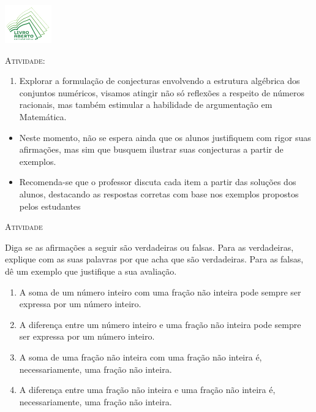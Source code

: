 \documentclass[10 pt,usenames,dvipsnames, oneside]{article}
\begin{document}
\begin{center}
  \begin{minipage}[l]{3cm}
\includegraphics[width=2cm]{../../../Figuras/logo}       
\end{minipage}\hfill
\begin{minipage}[r]{.8\textwidth}
 {\Large \scshape Atividade: }  
\end{minipage}
\end{center}
\vspace{.2cm}

\ifdefined\prof
\begin{goals}
\begin{enumerate}
    \item       Explorar a formulação de conjecturas envolvendo a estrutura algébrica dos conjuntos numéricos, visamos atingir não só reflexões a respeito de números racionais, mas também estimular a habilidade de argumentação em Matemática.
\end{enumerate}

\tcblower

\begin{itemize}
    \item       Neste momento, não se espera ainda que os alunos justifiquem com rigor suas afirmações, mas sim que busquem ilustrar suas conjecturas a partir de exemplos.
    \item       Recomenda-se que o professor discuta cada item a partir das soluções dos alunos, destacando as respostas corretas com base nos exemplos propostos pelos estudantes
\end{itemize}
\end{goals}

\bigskip
\begin{center}
{\large \scshape Atividade}
\end{center}
\fi

Diga se as afirmações a seguir são verdadeiras ou falsas. Para as verdadeiras, explique com as suas palavras por que acha que são verdadeiras. Para as falsas, dê um exemplo que justifique a sua avaliação.
\begin{enumerate}
  \item     A soma de um número inteiro com uma fração não inteira pode sempre ser expressa por um número inteiro.
  \item     A diferença entre um número inteiro e uma fração não inteira pode sempre ser expressa por um número inteiro.
  \item     A soma de uma fração não inteira com uma fração não inteira é, necessariamente, uma fração não inteira.
  \item     A diferença entre uma fração não inteira e uma fração não inteira é, necessariamente, uma fração não inteira.
\end{enumerate}
\end{document}
